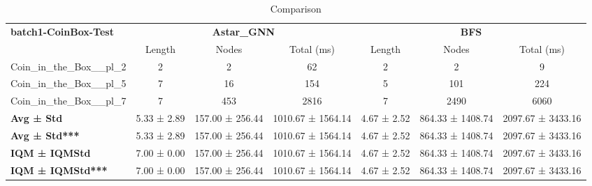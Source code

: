 \begin{table}[!ht]
\centering
\small
\begin{tabular}{l|ccc|ccc}
\multirow{2}{*}{\textbf{batch1-CoinBox-Test}} & \multicolumn{3}{c|}{\textbf{Astar\_GNN}} & \multicolumn{3}{c}{\textbf{BFS}} \\
\cline{2-7}
& Length & Nodes & Total (ms) & Length & Nodes & Total (ms) \\
\hline
Coin\_in\_the\_Box\_\_pl\_2 & 2 & 2 & 62 & 2 & 2 & 9 \\
Coin\_in\_the\_Box\_\_pl\_5 & 7 & 16 & 154 & 5 & 101 & 224 \\
Coin\_in\_the\_Box\_\_pl\_7 & 7 & 453 & 2816 & 7 & 2490 & 6060 \\
\hline
\textbf{Avg ± Std} & 5.33 ± 2.89 & 157.00 ± 256.44 & 1010.67 ± 1564.14 & 4.67 ± 2.52 & 864.33 ± 1408.74 & 2097.67 ± 3433.16 \\
\textbf{Avg ± Std***} & 5.33 ± 2.89 & 157.00 ± 256.44 & 1010.67 ± 1564.14 & 4.67 ± 2.52 & 864.33 ± 1408.74 & 2097.67 ± 3433.16 \\
\textbf{IQM ± IQMStd} & 7.00 ± 0.00 & 157.00 ± 256.44 & 1010.67 ± 1564.14 & 4.67 ± 2.52 & 864.33 ± 1408.74 & 2097.67 ± 3433.16 \\
\textbf{IQM ± IQMStd***} & 7.00 ± 0.00 & 157.00 ± 256.44 & 1010.67 ± 1564.14 & 4.67 ± 2.52 & 864.33 ± 1408.74 & 2097.67 ± 3433.16 \\
\end{tabular}
\caption{Comparison}
\label{tab:batch1_CoinBox_comparison_test}
\end{table}
